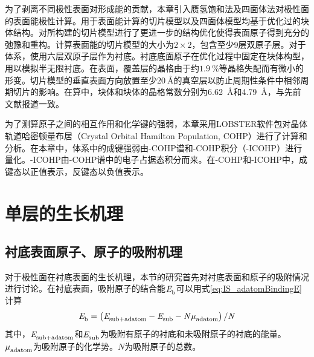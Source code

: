 为了剥离不同极性表面对形成能的贡献，本章引入赝氢饱和法及四面体法对极性面的表面能极性计算。用于表面能计算的切片模型以及四面体模型均基于优化过的块体结构。对所构建的切片模型进行了更进一步的结构优化使得表面原子得到充分的弛豫和重构。计算表面能的切片模型的大小为$2 \times 2$，包含至少9层双原子层。对于体系，使用六层双原子层作为衬底。衬底底面原子在优化过程中固定在块体构型，用以模拟半无限衬底。在表面，覆盖层的晶格由于约$\SI{1.9}{\percent}$等晶格失配而有微小的形变。切片模型的垂直表面方向放置至少$\SI{20}{\angstrom}$的真空层以防止周期性条件中相邻周期切片的影响。在算中，块体和块体的晶格常数分别为\SI{6.62}{\angstrom}和\SI{4.79}{\angstrom}，与先前文献报道一致。

为了测算原子之间的相互作用和化学键的强弱，本章采用LOBSTER软件包对晶体轨道哈密顿量布居（Crystal Orbital Hamilton Population, COHP）进行了计算和分析。在本章中，体系中的成键强弱由-COHP谱和-COHP积分（-ICOHP）进行量化。-ICOHP由-COHP谱中的电子占据态积分而来。在-COHP和-ICOHP中，成键态以正值表示，反键态以负值表示。

\section{单层的生长机理}

\subsection{衬底表面原子、原子的吸附机理}
\def\TfourSite{\rm T_{4} \it}
\def\HthreeSite{\rm H_{3} \it}
\def\mievpas{\milli\electronvolt\per\angstrom\squared}
\def\InSbMLpolar#1#2{\rm #1-In/#2-Sb}
\def\NumOfAdatom{\it N_{\rm adatoms} \it}
\def\CNinNsb#1#2#3#4{\rm #1/#2{}_{#3InV}^{#4SbT} \it}

对于极性面在衬底表面的生长机理，本节的研究首先对衬底表面和原子的吸附情况进行讨论。在衬底表面，吸附原子的结合能$\it E_{\rm b}^{\rm } \it$可以用式\eqref{eq:IS_adatomBindingE}计算\chinesecolon
\begin{equation}
    \label{eq:IS_adatomBindingE}
    \it E_{\rm b}^{\rm } \it=\left(\it E_{\rm sub+adatom}^{\rm } \it-\it E_{\rm sub}^{\rm } \it-N\it \mu_{\rm adatom}^{\rm } \it\right)/ N
\end{equation}
其中，$\it E_{\rm sub+adatom}^{\rm } \it$和$\it E_{\rm sub}^{\rm } \it$为吸附有原子的衬底和未吸附原子的衬底的能量。$\it \mu_{\rm adatom}^{\rm } \it$为吸附原子的化学势。$N$为吸附原子的总数。

